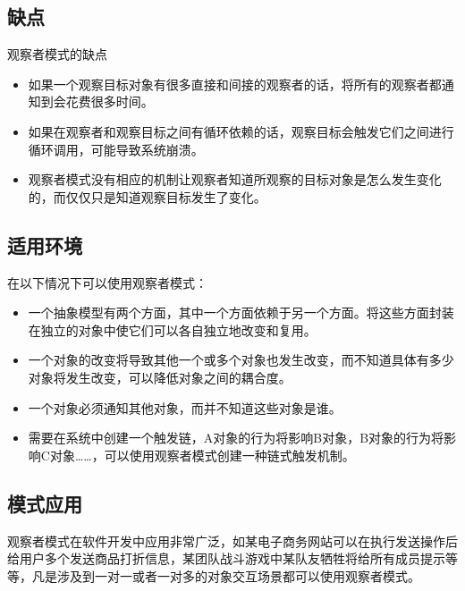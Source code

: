 \documentclass[letterpaper,10pt,english]{sphinxmanual}
\begin{document}
\subsection{缺点}
\label{\detokenize{behavioral_patterns/observer:id11}}
\sphinxAtStartPar
观察者模式的缺点
\begin{itemize}
\item {} 
\sphinxAtStartPar
如果一个观察目标对象有很多直接和间接的观察者的话，将所有的观察者都通知到会花费很多时间。

\item {} 
\sphinxAtStartPar
如果在观察者和观察目标之间有循环依赖的话，观察目标会触发它们之间进行循环调用，可能导致系统崩溃。

\item {} 
\sphinxAtStartPar
观察者模式没有相应的机制让观察者知道所观察的目标对象是怎么发生变化的，而仅仅只是知道观察目标发生了变化。

\end{itemize}


\subsection{适用环境}
\label{\detokenize{behavioral_patterns/observer:id12}}
\sphinxAtStartPar
在以下情况下可以使用观察者模式：
\begin{itemize}
\item {} 
\sphinxAtStartPar
一个抽象模型有两个方面，其中一个方面依赖于另一个方面。将这些方面封装在独立的对象中使它们可以各自独立地改变和复用。

\item {} 
\sphinxAtStartPar
一个对象的改变将导致其他一个或多个对象也发生改变，而不知道具体有多少对象将发生改变，可以降低对象之间的耦合度。

\item {} 
\sphinxAtStartPar
一个对象必须通知其他对象，而并不知道这些对象是谁。

\item {} 
\sphinxAtStartPar
需要在系统中创建一个触发链，A对象的行为将影响B对象，B对象的行为将影响C对象……，可以使用观察者模式创建一种链式触发机制。

\end{itemize}


\subsection{模式应用}
\label{\detokenize{behavioral_patterns/observer:id13}}
\sphinxAtStartPar
观察者模式在软件开发中应用非常广泛，如某电子商务网站可以在执行发送操作后给用户多个发送商品打折信息，某团队战斗游戏中某队友牺牲将给所有成员提示等等，凡是涉及到一对一或者一对多的对象交互场景都可以使用观察者模式。
\end{document}
